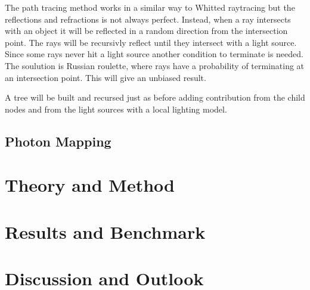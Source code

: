 \documentclass[a4paper, twocolumn]{article}
\begin{document}
    The path tracing method works in a similar way to Whitted raytracing but the reflections and refractions is not always perfect. Instead, when a ray intersects with an object it will be reflected in a random direction from the intersection point. The rays will be recursivly reflect until they intersect with a light source. Since some rays never hit a light source another condition to terminate is needed. The soulution is Russian roulette, where rays have a probability of terminating at an intersection point. This will give an unbiased result.

    A tree will be built and recursed just as before adding contribution from the child nodes and from the light sources with a local lighting model. 
    \subsection{Photon Mapping} \label{sec:photon_mapping}

    \clearpage

    \section{Theory and Method} \label{sec:theory_and_method}

    \section{Results and Benchmark} \label{sec:results_and_benchmark}

    \section{Discussion and Outlook} \label{sec:discussion_and_outlook}

    \newpage %
    \nocite{*} %
    
    
\end{document}
